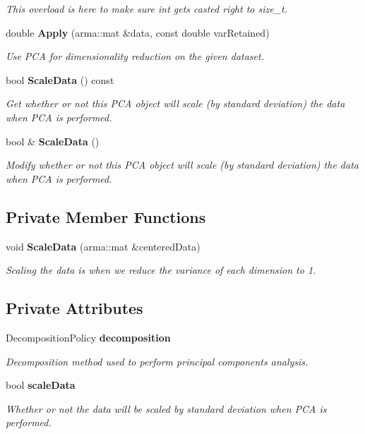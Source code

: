 \begin{DoxyCompactItemize}
\begin{DoxyCompactList}\small\item\em This overload is here to make sure int gets casted right to size\+\_\+t. \end{DoxyCompactList}\item 
double {\bf Apply} (arma\+::mat \&data, const double var\+Retained)
\begin{DoxyCompactList}\small\item\em Use P\+CA for dimensionality reduction on the given dataset. \end{DoxyCompactList}\item 
bool {\bf Scale\+Data} () const 
\begin{DoxyCompactList}\small\item\em Get whether or not this P\+CA object will scale (by standard deviation) the data when P\+CA is performed. \end{DoxyCompactList}\item 
bool \& {\bf Scale\+Data} ()
\begin{DoxyCompactList}\small\item\em Modify whether or not this P\+CA object will scale (by standard deviation) the data when P\+CA is performed. \end{DoxyCompactList}\end{DoxyCompactItemize}
\subsection*{Private Member Functions}
\begin{DoxyCompactItemize}
\item 
void {\bf Scale\+Data} (arma\+::mat \&centered\+Data)
\begin{DoxyCompactList}\small\item\em Scaling the data is when we reduce the variance of each dimension to 1. \end{DoxyCompactList}\end{DoxyCompactItemize}
\subsection*{Private Attributes}
\begin{DoxyCompactItemize}
\item 
Decomposition\+Policy {\bf decomposition}
\begin{DoxyCompactList}\small\item\em Decomposition method used to perform principal components analysis. \end{DoxyCompactList}\item 
bool {\bf scale\+Data}
\begin{DoxyCompactList}\small\item\em Whether or not the data will be scaled by standard deviation when P\+CA is performed. \end{DoxyCompactList}\end{DoxyCompactItemize}


